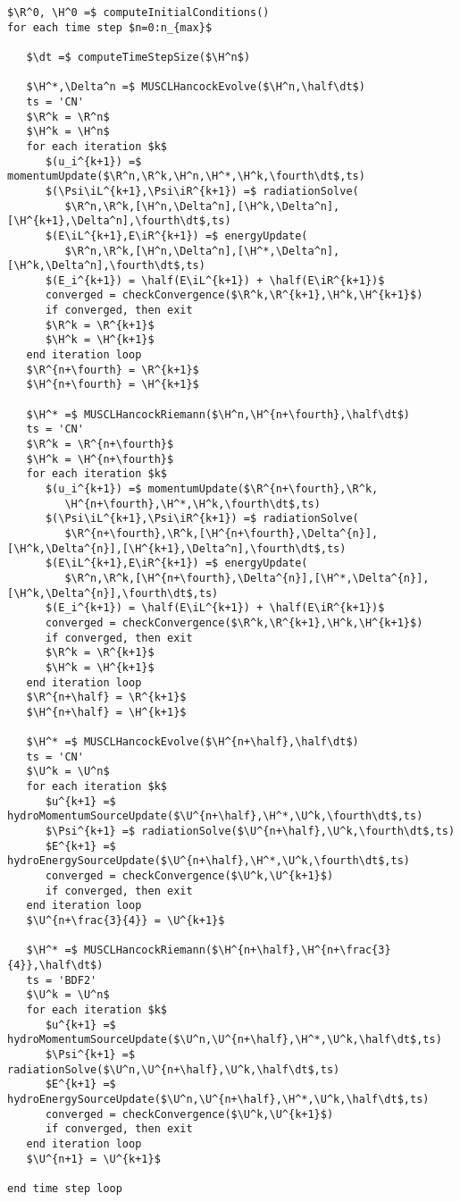 \begin{lstlisting}[mathescape,columns=fullflexible,
   basicstyle=\fontfamily{lmvtt}\selectfont]
$\R^0, \H^0 =$ computeInitialConditions()
for each time step $n=0:n_{max}$

   $\dt =$ computeTimeStepSize($\H^n$)

   $\H^*,\Delta^n =$ MUSCLHancockEvolve($\H^n,\half\dt$)
   ts = 'CN'
   $\R^k = \R^n$
   $\H^k = \H^n$
   for each iteration $k$
      $(u_i^{k+1}) =$ momentumUpdate($\R^n,\R^k,\H^n,\H^*,\H^k,\fourth\dt$,ts)
      $(\Psi\iL^{k+1},\Psi\iR^{k+1}) =$ radiationSolve(
         $\R^n,\R^k,[\H^n,\Delta^n],[\H^k,\Delta^n],[\H^{k+1},\Delta^n],\fourth\dt$,ts)
      $(E\iL^{k+1},E\iR^{k+1}) =$ energyUpdate(
         $\R^n,\R^k,[\H^n,\Delta^n],[\H^*,\Delta^n],[\H^k,\Delta^n],\fourth\dt$,ts)
      $(E_i^{k+1}) = \half(E\iL^{k+1}) + \half(E\iR^{k+1})$
      converged = checkConvergence($\R^k,\R^{k+1},\H^k,\H^{k+1}$)
      if converged, then exit
      $\R^k = \R^{k+1}$
      $\H^k = \H^{k+1}$
   end iteration loop
   $\R^{n+\fourth} = \R^{k+1}$
   $\H^{n+\fourth} = \H^{k+1}$

   $\H^* =$ MUSCLHancockRiemann($\H^n,\H^{n+\fourth},\half\dt$)
   ts = 'CN'
   $\R^k = \R^{n+\fourth}$
   $\H^k = \H^{n+\fourth}$
   for each iteration $k$
      $(u_i^{k+1}) =$ momentumUpdate($\R^{n+\fourth},\R^k,
         \H^{n+\fourth},\H^*,\H^k,\fourth\dt$,ts)
      $(\Psi\iL^{k+1},\Psi\iR^{k+1}) =$ radiationSolve(
         $\R^{n+\fourth},\R^k,[\H^{n+\fourth},\Delta^{n}],[\H^k,\Delta^{n}],[\H^{k+1},\Delta^n],\fourth\dt$,ts)
      $(E\iL^{k+1},E\iR^{k+1}) =$ energyUpdate(
         $\R^n,\R^k,[\H^{n+\fourth},\Delta^{n}],[\H^*,\Delta^{n}],[\H^k,\Delta^{n}],\fourth\dt$,ts)
      $(E_i^{k+1}) = \half(E\iL^{k+1}) + \half(E\iR^{k+1})$
      converged = checkConvergence($\R^k,\R^{k+1},\H^k,\H^{k+1}$)
      if converged, then exit
      $\R^k = \R^{k+1}$
      $\H^k = \H^{k+1}$
   end iteration loop
   $\R^{n+\half} = \R^{k+1}$
   $\H^{n+\half} = \H^{k+1}$

   $\H^* =$ MUSCLHancockEvolve($\H^{n+\half},\half\dt$)
   ts = 'CN'
   $\U^k = \U^n$
   for each iteration $k$
      $u^{k+1} =$ hydroMomentumSourceUpdate($\U^{n+\half},\H^*,\U^k,\fourth\dt$,ts)
      $\Psi^{k+1} =$ radiationSolve($\U^{n+\half},\U^k,\fourth\dt$,ts)
      $E^{k+1} =$ hydroEnergySourceUpdate($\U^{n+\half},\H^*,\U^k,\fourth\dt$,ts)
      converged = checkConvergence($\U^k,\U^{k+1}$)
      if converged, then exit
   end iteration loop
   $\U^{n+\frac{3}{4}} = \U^{k+1}$

   $\H^* =$ MUSCLHancockRiemann($\H^{n+\half},\H^{n+\frac{3}{4}},\half\dt$)
   ts = 'BDF2'
   $\U^k = \U^n$
   for each iteration $k$
      $u^{k+1} =$ hydroMomentumSourceUpdate($\U^n,\U^{n+\half},\H^*,\U^k,\half\dt$,ts)
      $\Psi^{k+1} =$ radiationSolve($\U^n,\U^{n+\half},\U^k,\half\dt$,ts)
      $E^{k+1} =$ hydroEnergySourceUpdate($\U^n,\U^{n+\half},\H^*,\U^k,\half\dt$,ts)
      converged = checkConvergence($\U^k,\U^{k+1}$)
      if converged, then exit
   end iteration loop
   $\U^{n+1} = \U^{k+1}$

end time step loop
\end{lstlisting}

